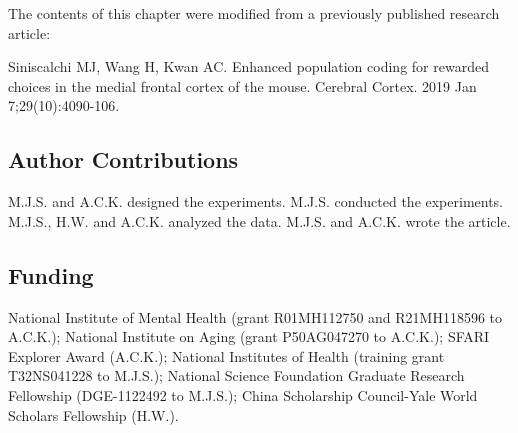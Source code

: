 
The contents of this chapter were modified from a previously published research article: 

\smallskip 
\begin{singlespace}
Siniscalchi MJ, Wang H, Kwan AC. Enhanced population coding for rewarded choices in the medial frontal cortex of the mouse. Cerebral Cortex. 2019 Jan 7;29(10):4090-106.
\end{singlespace}

\subsection*{Author Contributions}
M.J.S. and A.C.K. designed the experiments. M.J.S. conducted the experiments. M.J.S., H.W. and A.C.K. analyzed the data. M.J.S. and A.C.K. wrote the article.

\subsection*{Funding}
National Institute of Mental Health (grant R01MH112750 and R21MH118596 to A.C.K.); National Institute on Aging (grant P50AG047270 to A.C.K.); SFARI Explorer Award (A.C.K.); National Institutes of Health (training grant T32NS041228 to M.J.S.); National Science Foundation Graduate Research Fellowship (DGE-1122492 to M.J.S.); China Scholarship Council-Yale World Scholars Fellowship (H.W.).